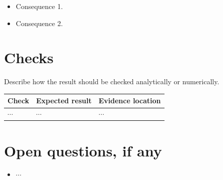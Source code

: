 \documentclass[11pt]{article}
\begin{document}
\begin{itemize}
    \item Consequence 1.
    \item Consequence 2.
\end{itemize}

\section{Checks}

Describe how the result should be checked analytically or numerically.

\begin{tabularx}{\textwidth}{XXX}
\toprule
Check & Expected result & Evidence location\\
\midrule
\(\cdots\) & \(\cdots\) & \(\cdots\)\\
\bottomrule
\end{tabularx}

\section{Open questions, if any}

\begin{itemize}
    \item \(\cdots\)
\end{itemize}
\end{document}

